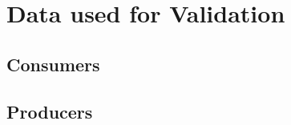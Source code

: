 \section{Data used for Validation}
\label{validation:data}

\subsection{Consumers}


\subsection{Producers}

